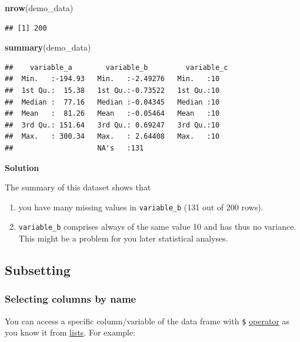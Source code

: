 \documentclass[
]{scrartcl}
\newenvironment{Shaded}{\begin{snugshade}}{\end{snugshade}}
\newcommand{\FunctionTok}[1]{\textcolor[rgb]{0.13,0.29,0.53}{\textbf{#1}}}
\newcommand{\NormalTok}[1]{#1}
\providecommand{\tightlist}{%
  \setlength{\itemsep}{0pt}\setlength{\parskip}{0pt}}
\newenvironment{webexsolution}[1]
    {\par\tiny\textbf{#1}}
    {\par}
\newcommand{\webexhide}[1]{\begin{webexsolution}{#1}}
\newcommand{\webexunhide}{\end{webexsolution}}
\begin{document}
\begin{Shaded}
\begin{Highlighting}[]
\FunctionTok{nrow}\NormalTok{(demo\_data)}
\end{Highlighting}
\end{Shaded}

\begin{verbatim}
## [1] 200
\end{verbatim}

\begin{Shaded}
\begin{Highlighting}[]
\FunctionTok{summary}\NormalTok{(demo\_data)}
\end{Highlighting}
\end{Shaded}

\begin{verbatim}
##    variable_a        variable_b         variable_c
##  Min.   :-194.93   Min.   :-2.49276   Min.   :10  
##  1st Qu.:  15.38   1st Qu.:-0.73522   1st Qu.:10  
##  Median :  77.16   Median :-0.04345   Median :10  
##  Mean   :  81.26   Mean   :-0.05464   Mean   :10  
##  3rd Qu.: 151.64   3rd Qu.: 0.69247   3rd Qu.:10  
##  Max.   : 300.34   Max.   : 2.64408   Max.   :10  
##                    NA's   :131
\end{verbatim}

\webexhide{Solution}

The summary of this dataset shows that

\begin{enumerate}
\def\labelenumi{\arabic{enumi}.}
\tightlist
\item
  you have many missing values in \texttt{variable\_b} (131 out of 200 rows).
\item
  \texttt{variable\_b} comprises always of the same value 10 and has thus no variance. This might be a problem for you later statistical analyses.
\end{enumerate}

\webexunhide

\subsection{Subsetting}\label{nolabel}

\subsubsection{Selecting columns by name}\label{selectbyname}

You can access a specific column/variable of the data frame with \texttt{\$} \hyperref[listsdollar]{operator} as you know it from \hyperref[lists]{lists}. For example:
\end{document}
